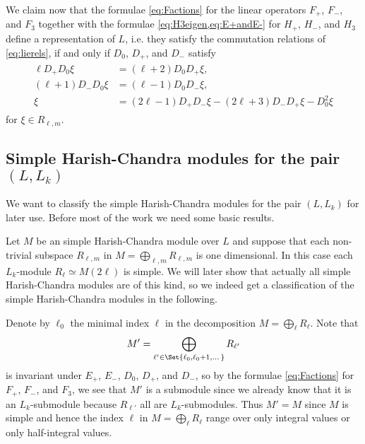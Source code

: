 We claim now that the formulae \cref{eq:Factions} for the linear operators $F_+$, $F_-$, and $F_3$ together with the formulae \cref{eq:H3eigen,eq:E+andE-} for $H_+$, $H_-$, and $H_3$ define a representation of $L$, i.e. they satisfy the commutation relations of \cref{eq:lierels}, if and only if $D_0$, $D_+$, and $D_-$ satisfy
\begin{align}\label{eq:Drels}
  \begin{aligned}
    \ell D_+D_0 \xi &= (\ell+2)D_0 D_+ \xi, \\
    (\ell+1)D_-D_0 \xi &= (\ell-1)D_0D_-\xi, \\
    \xi &= (2\ell-1)D_+D_- \xi - (2\ell+3)D_-D_+\xi - D_0^2\xi
  \end{aligned}
\end{align}
for $\xi\in R_{\ell,m}$. 

\subsection{\texorpdfstring{Simple Harish-Chandra modules for the pair $(L,L_k)$}{Simple Harish-Chandra modules for the pair (L,L\_k)}}

We want to classify the simple Harish-Chandra modules for the pair $(L,L_k)$ for later use. Before most of the work we need some basic results.

Let $M$ be an simple Harish-Chandra module over $L$ and suppose that each non-trivial subspace $R_{\ell,m}$ in $M=\bigoplus_{\ell,m} R_{\ell,m}$ is one dimensional. In this case each $L_k$-module $R_\ell\simeq M(2\ell)$ is simple. We will later show that actually all simple Harish-Chandra modules are of this kind, so we indeed get a classification of the simple Harish-Chandra modules in the following.

Denote by $\ell_0$ the minimal index $\ell$ in the decomposition $M=\bigoplus_\ell R_\ell$. Note that
\begin{align*}
  M' = \bigoplus_{\ell'\in\Set{\ell_0,\ell_0+1,\dotsc}} R_{\ell'}
\end{align*}
is invariant under $E_+$, $E_-$, $D_0$, $D_+$, and $D_-$, so by the formulae \cref{eq:Factions} for $F_+$, $F_-$, and $F_3$, we see that $M'$ is a submodule since we already know that it is an $L_k$-submodule because $R_{\ell'}$ all are $L_k$-submodules. Thus $M'=M$ since $M$ is simple and hence the index $\ell$ in $M=\bigoplus_\ell R_\ell$ range over only integral values or only half-integral values.

